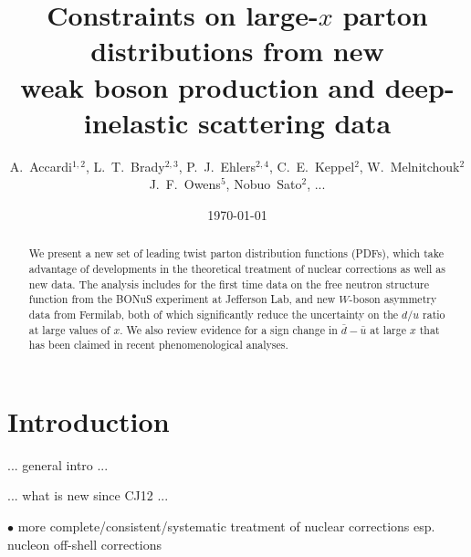 \documentclass[aps,prd,amsmath,preprint]{revtex4}
\begin{document}
\title{Constraints on large-$x$ parton distributions from new \\
	weak boson production and deep-inelastic scattering data}

\author{A.~Accardi$^{1,2}$,
	L.~T.~Brady$^{2,3}$,
	P.~J.~Ehlers$^{2,4}$,
	C.~E.~Keppel$^2$,
	W.~Melnitchouk$^2$
	J.~F.~Owens$^5$,
	Nobuo~Sato$^2$, ...}



\date{\today}

\begin{abstract}
We present a new set of leading twist parton distribution functions
(PDFs), which take advantage of developments in the theoretical
treatment of nuclear corrections as well as new data.
The analysis includes for the first time data on the free neutron
structure function from the BONuS experiment at Jefferson Lab,
and new $W$-boson asymmetry data from Fermilab, both of which
significantly reduce the uncertainty on the $d/u$ ratio at large
values of $x$.
We also review evidence for a sign change in $\bar d-\bar u$ at
large $x$ that has been claimed in recent phenomenological analyses.
\end{abstract}

\maketitle


\section{Introduction}
\label{sec:intro}

... general intro ...

... what is new since CJ12 ...

$\bullet$
more complete/consistent/systematic treatment of nuclear corrections
esp. nucleon off-shell corrections
\end{document}
